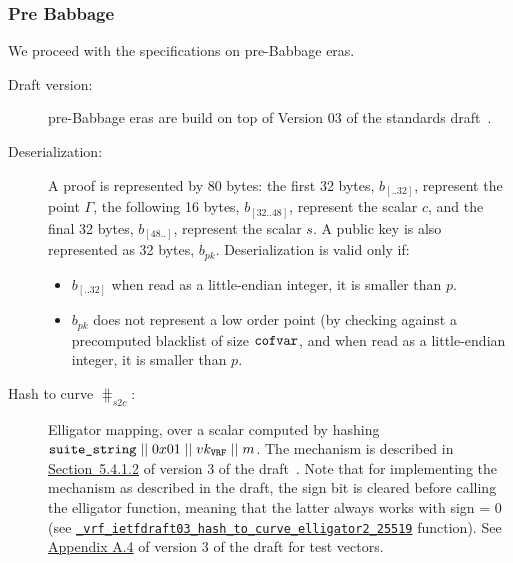 \subsubsection{Pre Babbage}
We proceed with the specifications on pre-Babbage eras.
\begin{description}
    \item[Draft version:] pre-Babbage eras are build on top of Version 03 of the standards draft~\cite{vrfdraft03}.
    \item[Deserialization:] A \vrf proof is represented by 80 bytes: the first 32 bytes, $b_{[..32]}$, represent the
    point $\Gamma$, the following 16 bytes, $b_{[32..48]}$, represent the scalar $c$, and the final 32 bytes,
    $b_{[48..]}$, represent the scalar $s$. A public key is also represented as 32 bytes, $b_{pk}$.
    Deserialization is valid only if:
    \begin{itemize}
        \item $b_{[..32]}$ when read as a little-endian integer, it is smaller than $p$.
        \item $b_{pk}$ does not represent a low order point (by checking against a precomputed blacklist of size
        $\texttt{cofvar}$, and when read as a little-endian integer, it is smaller than $p$.
    \end{itemize}
    \item[Hash to curve $\hash_{s2c}$:] \sloppy Elligator mapping, over a scalar computed by
    hashing $\texttt{suite\_string}\;||\; 0x01\;||\; vk_{\texttt{VRF}} \;||\; m$. The
    mechanism is described in
    \href{https://datatracker.ietf.org/doc/html/draft-irtf-cfrg-vrf-03#section-5.4.1.2}{Section~5.4.1.2}
    of version 3 of the draft~\cite{vrfdraft03}. Note that for
    implementing the mechanism as described in the draft, the sign bit is cleared before calling
    the elligator function, meaning that the latter always works with sign = 0 (see \href{https://github
.com/input-output-hk/libsodium/blob/tdammers/rebased-vrf/src/libsodium/crypto_vrf/ietfdraft03/convert
.c#L84}{\texttt{\_vrf\_ietfdraft03\_hash\_to\_curve\_elligator2\_25519}}
    function). See \href{https://datatracker.ietf.org/doc/html/draft-irtf-cfrg-vrf-03#appendix-A.4}{Appendix A.4} of
    version 3 of the draft for test vectors.
\end{description}

